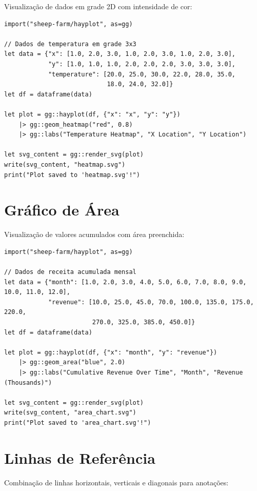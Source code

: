 \documentclass[12pt, a4paper, oneside]{book}
\begin{document}
Visualização de dados em grade 2D com intensidade de cor:

\begin{lstlisting}[caption={examples/heatmap.hay}]
import("sheep-farm/hayplot", as=gg)

// Dados de temperatura em grade 3x3
let data = {"x": [1.0, 2.0, 3.0, 1.0, 2.0, 3.0, 1.0, 2.0, 3.0],
            "y": [1.0, 1.0, 1.0, 2.0, 2.0, 2.0, 3.0, 3.0, 3.0],
            "temperature": [20.0, 25.0, 30.0, 22.0, 28.0, 35.0,
                            18.0, 24.0, 32.0]}
let df = dataframe(data)

let plot = gg::hayplot(df, {"x": "x", "y": "y"})
    |> gg::geom_heatmap("red", 0.8)
    |> gg::labs("Temperature Heatmap", "X Location", "Y Location")

let svg_content = gg::render_svg(plot)
write(svg_content, "heatmap.svg")
print("Plot saved to 'heatmap.svg'!")
\end{lstlisting}

\section{Gráfico de Área}

Visualização de valores acumulados com área preenchida:

\begin{lstlisting}[caption={examples/area\_chart.hay}]
import("sheep-farm/hayplot", as=gg)

// Dados de receita acumulada mensal
let data = {"month": [1.0, 2.0, 3.0, 4.0, 5.0, 6.0, 7.0, 8.0, 9.0, 10.0, 11.0, 12.0],
            "revenue": [10.0, 25.0, 45.0, 70.0, 100.0, 135.0, 175.0, 220.0,
                        270.0, 325.0, 385.0, 450.0]}
let df = dataframe(data)

let plot = gg::hayplot(df, {"x": "month", "y": "revenue"})
    |> gg::geom_area("blue", 2.0)
    |> gg::labs("Cumulative Revenue Over Time", "Month", "Revenue (Thousands)")

let svg_content = gg::render_svg(plot)
write(svg_content, "area_chart.svg")
print("Plot saved to 'area_chart.svg'!")
\end{lstlisting}

\section{Linhas de Referência}

Combinação de linhas horizontais, verticais e diagonais para anotações:
\end{document}
